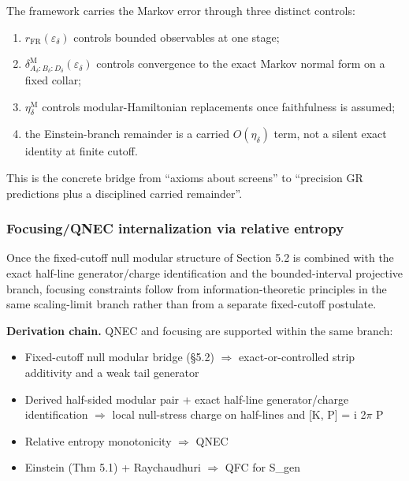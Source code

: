 The framework carries the Markov error through three distinct controls:
\begin{enumerate}
\def\labelenumi{\arabic{enumi}.}
\tightlist
\item
\(r_{\mathrm{FR}}(\varepsilon_\delta)\) controls bounded observables at one stage;
\item
\(\delta^{\mathrm M}_{A_\delta:B_\delta:D_\delta}(\varepsilon_\delta)\) controls convergence to the exact Markov normal form on a fixed collar;
\item
\(\eta_\delta^{\mathrm M}\) controls modular-Hamiltonian replacements once faithfulness is assumed;
\item
the Einstein-branch remainder is a carried \(O(\eta_\delta)\) term, not a silent exact identity at finite cutoff.
\end{enumerate}

This is the concrete bridge from ``axioms about screens'' to ``precision GR predictions plus a disciplined carried remainder''.

\subsubsection{Focusing/QNEC internalization via relative entropy}\label{510-focusingqnec-internalization-via-relative-entropy}

Once the fixed-cutoff null modular structure of Section 5.2 is combined with the exact half-line generator/charge identification and the bounded-interval projective branch, focusing constraints follow from information-theoretic principles in the same scaling-limit branch rather than from a separate fixed-cutoff postulate.

\textbf{Derivation chain.} QNEC and focusing are supported within the same branch:

\begin{itemize}
\tightlist
\item
  Fixed-cutoff null modular bridge (\S{}5.2) \ensuremath{\Longrightarrow} exact-or-controlled strip additivity and a weak tail generator
\item
  Derived half-sided modular pair + exact half-line generator/charge identification \ensuremath{\Longrightarrow} local null-stress charge on half-lines and {[}K, P{]} = i 2\ensuremath{\pi} P
\item
  Relative entropy monotonicity \ensuremath{\Longrightarrow} QNEC
\item
  Einstein (Thm 5.1) + Raychaudhuri \ensuremath{\Longrightarrow} QFC for S\_gen
\end{itemize}

